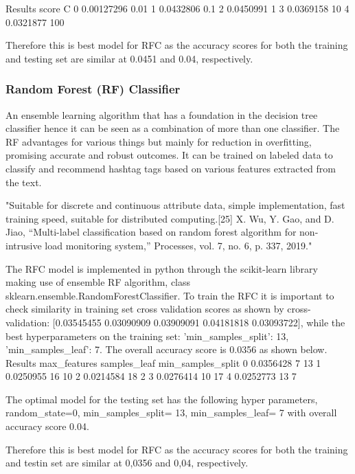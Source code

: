 Results         score      C  
0             0.00127296  0.01
1             0.0432806   0.1
2             0.0450991     1
3             0.0369158    10
4             0.0321877   100

Therefore this is best model for RFC as the accuracy scores for both the training and testing set are similar at 0.0451 and 0.04, respectively.

\subsubsection{Random Forest (RF) Classifier}

An ensemble learning algorithm that has a foundation in the decision tree classifier hence it can be seen as a combination of more than one classifier. The RF advantages for various things but mainly for reduction in overfitting, promising accurate and robust outcomes.   It can be trained on labeled data to classify and recommend hashtag tags based on various features extracted from the text.  

"Suitable for discrete and continuous attribute data,
simple implementation, fast training speed, suitable for
distributed computing.[25] X. Wu, Y. Gao, and D. Jiao, “Multi-label classification based on random forest algorithm for non-intrusive load monitoring system,” Processes, vol. 7, no. 6, p. 337, 2019."

The RFC model is implemented in python through the scikit-learn library making use of ensemble RF algorithm, 
class sklearn.ensemble.RandomForestClassifier.  To train the RFC it is important to check similarity in training set cross validation scores as shown by cross-validation: [0.03545455 0.03090909 0.03909091 0.04181818 0.03093722], while the best hyperparameters on the training set: {'min_samples_split': 13, 'min_samples_leaf': 7}.  The overall accuracy score is 0.0356 as shown below. 
      Results       max_features samples_leaf   min_samples_split
0    0.0356428            7                                 13
1    0.0250955           16                                 10
2    0.0214584           18                                  2
3    0.0276414           10                                 17
4    0.0252773           13                                  7

The optimal model for the testing set has the following hyper parameters, random_state=0, min_samples_split= 13, min_samples_leaf= 7 with overall accuracy score 0.04.  

Therefore this is best model for RFC as the accuracy scores for both the training and testin set are similar at 0,0356 and 0,04, respectively.

